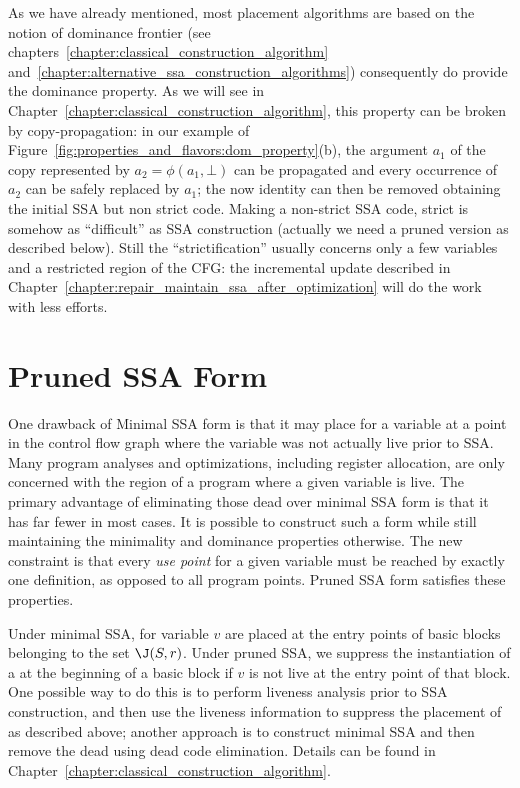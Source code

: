 As we have already mentioned, most \phifun placement algorithms are based on the notion of dominance frontier (see chapters~\ref{chapter:classical_construction_algorithm} and~\ref{chapter:alternative_ssa_construction_algorithms}) consequently do provide the dominance property. As we will see in Chapter~\ref{chapter:classical_construction_algorithm}, this property can be broken by copy-propagation: in our example of Figure~\ref{fig:properties_and_flavors:dom_property}(b), the argument $a_1$ of the copy represented by $a_2=\phi(a_1,\bot)$ can be propagated and every occurrence of $a_2$ can be safely replaced by $a_1$; the now identity \phifun can then be removed obtaining the initial SSA but non strict code. Making a non-strict SSA code, strict is somehow as ``difficult'' as SSA construction (actually we need a pruned version as described below). Still the ``strictification'' usually concerns only a few variables and a restricted region of the CFG: the incremental update described in Chapter~\ref{chapter:repair_maintain_ssa_after_optimization} will do the work with less efforts.

\section{Pruned SSA Form}
\label{sec-prop-pruned}

One drawback of Minimal SSA form is that it may place \phifuns
for a variable at a point in the control flow graph where the variable was
not actually live prior to SSA. Many program analyses and optimizations,
including register allocation, are only concerned with the region of a 
program where a given variable is live. 
The primary advantage of eliminating those dead \phifuns over minimal SSA form
is that it has far fewer \phifuns in most cases.  
It is possible to construct such a form while still maintaining the minimality
and dominance properties otherwise. The new constraint is that every
\emph{use point} for a given variable must be reached by exactly one
definition, as opposed to all program points. Pruned SSA form satisfies these properties. 

Under minimal SSA, \phifuns for variable $v$ are placed at
the entry points of basic blocks belonging to the set $\J(S,r)$. 
Under pruned SSA, we suppress the instantiation of a \phifun
at the beginning of a basic block if $v$ is not live
at the entry point of that block. One possible way to do this is to
perform liveness analysis prior to SSA construction, and then
use the liveness information to suppress the placement of \phifuns
as described above; another approach is to construct minimal SSA
and then remove the dead \phifuns using dead code
elimination. Details can be found in Chapter~\ref{chapter:classical_construction_algorithm}.

